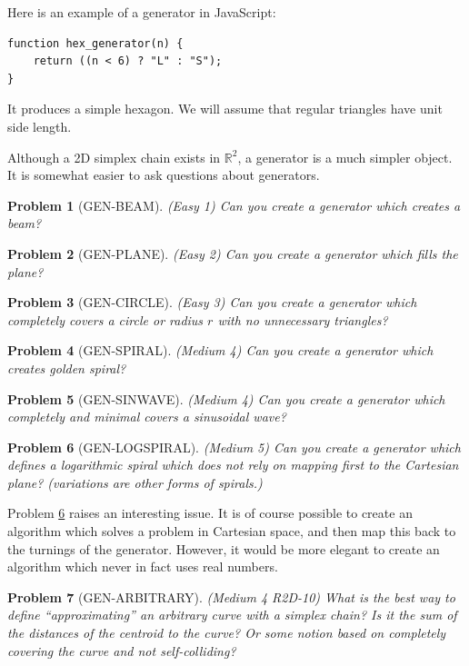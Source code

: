 \documentclass[11pt]{article}
\newtheorem{problem}{Problem}
\begin{document}
  Here is an example of a generator in JavaScript:
\begin{verbatim}
function hex_generator(n) {
    return ((n < 6) ? "L" : "S");
}
\end{verbatim}
It produces a simple hexagon. We will assume that regular triangles have unit side length.

Although a 2D simplex chain exists in $\mathbb{R}^2$, a generator is a much simpler object.  It is somewhat easier to ask questions about
generators.

\begin{problem}[GEN-BEAM]
  (Easy 1) Can you create a generator which creates a beam?
\end{problem}
\begin{problem}[GEN-PLANE]
(Easy 2) Can you create a generator which fills the plane?  
\end{problem}
\begin{problem}[GEN-CIRCLE]
  (Easy 3) Can you create a generator which completely covers a circle or radius $r$ with no unnecessary triangles?
\end{problem}
\begin{problem}[GEN-SPIRAL]
  (Medium 4) Can you create a generator which creates golden spiral?
\end{problem}
\begin{problem}[GEN-SINWAVE]
  (Medium 4) Can you create a generator which completely and minimal covers a sinusoidal wave?
\end{problem}
\begin{problem}[GEN-LOGSPIRAL]
  \label{probgenlogspiral}
  (Medium 5) Can you create a generator which defines a logarithmic spiral which does not rely on mapping first to the Cartesian plane?
  (variations are other forms of spirals.)
\end{problem}
Problem \ref{probgenlogspiral} raises an interesting issue. It is of course possible to create an algorithm which solves a problem in Cartesian space, and then
map this back to the turnings of the generator. However, it would be more elegant to create an algorithm which never in fact uses real numbers.


\begin{problem}[GEN-ARBITRARY]
(Medium 4 R2D-10) What is the best way to define ``approximating'' an arbitrary  curve with a simplex chain? Is it the sum of the distances of the centroid to the curve?
  Or some notion based on completely covering the curve and not self-colliding?  
\end{problem}
\end{document}
